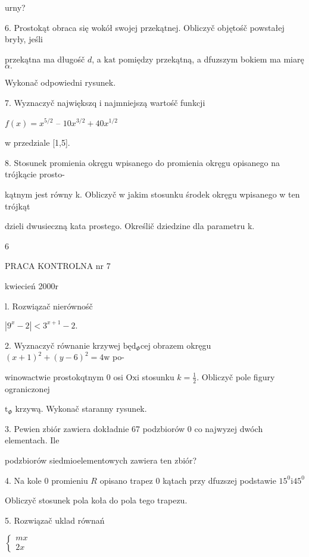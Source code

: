 \documentclass[a4paper,12pt]{article}
\begin{document}
urny?

6. Prostokąt obraca się wokół swojej przekątnej. Obliczyč objętośč powstałej bryły, jeśli

przekątna ma długośč $d$, a $\mathrm{k}\mathrm{a}\mathrm{t}$ pomiędzy przekątną, a dfuzszym bokiem ma miarę $\alpha.$

Wykonač odpowiedni rysunek.

7. Wyznaczyč największq $\mathrm{i}$ najmniejszą wartośč funkcji

$f(x) =x^{5/2}$ -- $10x^{3/2}+40x^{1/2}$

w przedziale [1,5].

8. Stosunek promienia okręgu wpisanego do promienia okręgu opisanego na trójkącie prosto-

kątnym jest równy k. Obliczyč w jakim stosunku środek okręgu wpisanego w ten trójkąt

dzieli dwusieczną kata prostego. Określič dziedzine dla parametru k.

6





PRACA KONTROLNA nr 7

kwiecień 2000r

l. Rozwiązač nierównośč

$|9^{x}-2|<3^{x+1}-2.$

2. Wyznaczyč równanie krzywej $\mathrm{b}\text{ę} \mathrm{d}_{\Phi}\mathrm{c}\mathrm{e}\mathrm{j}$ obrazem okręgu $(x+1)^{2}+(y-6)^{2}=4\mathrm{w}$ po-

winowactwie prostokqtnym $0$ osi $\mathrm{O}\mathrm{x}\mathrm{i}$ stosunku $k=\displaystyle \frac{1}{2}$. Obliczyč pole figury ograniczonej

$\mathrm{t}_{\Phi}$ krzywą. Wykonač staranny rysunek.

3. Pewien zbiór zawiera dokładnie 67 podzbiorów $0$ co najwyzej dwóch elementach. Ile

podzbiorów siedmioelementowych zawiera ten zbiór?

4. Na kole $0$ promieniu $R$ opisano trapez $0$ kątach przy dfuzszej podstawie $15^{0} \mathrm{i} 45^{0}$

Obliczyč stosunek pola koła do pola tego trapezu.

5. Rozwiązač uklad równań

$\left\{\begin{array}{l}
mx\\
2x
\end{array}\right.$
\end{document}
